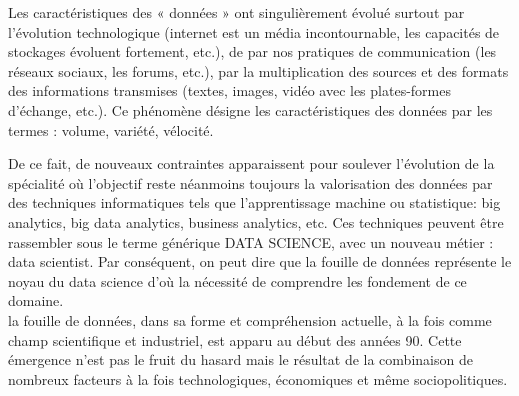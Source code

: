 \documentclass[runningheads,a4paper]{llncs}
\begin{document}
Les caractéristiques des « données » ont singulièrement évolué surtout par l’évolution technologique (internet est un média incontournable, les capacités de stockages évoluent fortement, etc.), de par nos pratiques de communication (les réseaux sociaux, les forums, etc.), par la multiplication des sources et des formats des informations transmises (textes, images, vidéo avec les plates-formes d’échange, etc.). Ce phénomène désigne les  caractéristiques des données par les termes : volume, variété, vélocité.

De ce fait, de nouveaux contraintes apparaissent pour soulever l’évolution de la spécialité où l’objectif reste néanmoins toujours la valorisation des données par des techniques informatiques tels que l'apprentissage machine ou statistique: big analytics, big data analytics, business analytics, etc. Ces techniques peuvent être rassembler sous le terme générique DATA SCIENCE, avec un nouveau métier : data scientist. Par conséquent, on peut dire que la fouille de données représente le noyau du data science d’où la nécessité de comprendre les fondement de ce domaine.  \\
la fouille de données,  dans  sa  forme  et  compréhension  actuelle,  à  la  fois  comme 
champ  scientifique  et  industriel,  est  apparu  au  début  des  années  90.  Cette 
émergence n’est pas le fruit du hasard mais le résultat de la combinaison de nombreux   facteurs à la fois technologiques, économiques  et même sociopolitiques. \\
\end{document}
